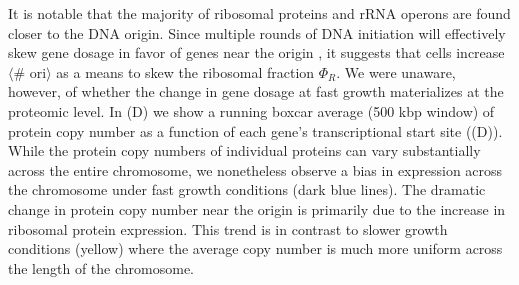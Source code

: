 
It is notable that the majority of ribosomal proteins and rRNA operons are found
closer to the DNA origin. Since multiple rounds of DNA initiation will effectively
skew gene dosage in favor of genes near the origin \citep{scholz2019}, it suggests
that cells increase  $\langle$\# ori$\rangle$ as a means to skew the ribosomal fraction $\Phi_R$.
We were unaware, however, of whether the change in gene dosage at fast growth
materializes at the proteomic level. In (D) we show
a running boxcar average (500 kbp window) of protein copy number as a function
of each gene's transcriptional start site ((D)).
While the protein copy numbers of individual proteins can vary substantially
across the entire chromosome, we nonetheless observe a bias in expression across
the chromosome under fast growth conditions (dark blue lines). The dramatic
change in protein copy number near the origin is primarily due to the increase
in ribosomal protein expression. This trend is in contrast to slower growth
conditions (yellow) where the average copy number is much more uniform across
the length of the chromosome.

